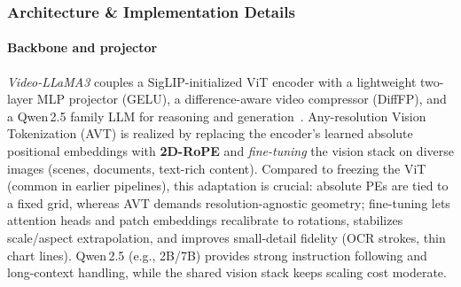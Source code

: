 \begin{enrichment}
\begin{enrichment}
        \subsubsection{Architecture \& Implementation Details}
        \label{subsubsec:chapter24_videollama3_arch}
        
        \paragraph{Backbone and projector}
        \emph{Video\mbox{-}LLaMA3} couples a SigLIP\mbox{-}initialized ViT encoder with a lightweight two\mbox{-}layer MLP projector (GELU), a difference\mbox{-}aware video compressor (DiffFP), and a Qwen\,2.5 family LLM for reasoning and generation~\cite{zhai2023_siglip,zhang2025_videollama3,qwen2025_qwen25technicalreport}. Any\mbox{-}resolution Vision Tokenization (AVT) is realized by replacing the encoder’s learned absolute positional embeddings with \textbf{2D\mbox{-}RoPE} and \emph{fine\mbox{-}tuning} the vision stack on diverse images (scenes, documents, text\mbox{-}rich content). Compared to freezing the ViT (common in earlier pipelines), this adaptation is crucial: absolute PEs are tied to a fixed grid, whereas AVT demands resolution\mbox{-}agnostic geometry; fine\mbox{-}tuning lets attention heads and patch embeddings recalibrate to rotations, stabilizes scale/aspect extrapolation, and improves small\mbox{-}detail fidelity (OCR strokes, thin chart lines). Qwen\,2.5 (e.g., 2B/7B) provides strong instruction following and long\mbox{-}context handling, while the shared vision stack keeps scaling cost moderate.
        

\end{enrichment}
\end{enrichment}
